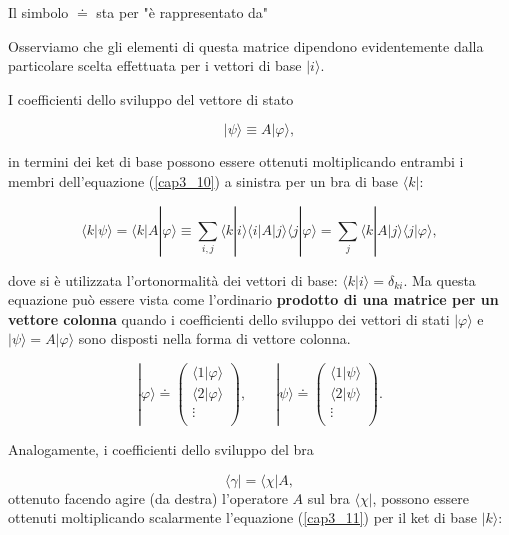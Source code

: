 \documentclass[a4paper,12pt,oneside]{book}
\begin{document}
Il simbolo $\doteq$ sta per "è rappresentato da"

Osserviamo che gli elementi di questa matrice dipendono evidentemente dalla particolare scelta effettuata per i vettori di base $| i \rangle$.

I coefficienti dello sviluppo del vettore di stato

\begin{equation}
| \psi \rangle \equiv A | \varphi \rangle ,
\end{equation}

in termini dei ket di base possono essere ottenuti moltiplicando entrambi i membri dell'equazione (\ref{cap3_10}) a sinistra per un bra di base $\langle k | $:

\begin{equation}
\langle k | \psi \rangle = \langle k | A | \varphi \rangle \equiv \sum \limits_{i,j} \langle k | i \rangle \langle i | A | j\rangle \langle j | \varphi \rangle = \sum \limits_{j} \langle k | A | j \rangle \langle j | \varphi \rangle ,
\end{equation}

dove si è utilizzata l'ortonormalità dei vettori di base: $\langle k | i \rangle =\delta_{ki}$. Ma questa equazione può essere vista come l'ordinario \textbf{prodotto di una matrice per un vettore colonna} quando i coefficienti dello sviluppo dei vettori di stati $| \varphi \rangle$ e $| \psi \rangle =A | \varphi \rangle$ sono disposti nella forma di vettore colonna.

\begin{equation}
| \varphi \rangle \doteq 
\begin{pmatrix}
\langle 1 | \varphi \rangle \\
\langle 2 | \varphi \rangle \\
\vdots \\
\end{pmatrix}, \qquad
| \psi \rangle \doteq 
\begin{pmatrix}
\langle 1 | \psi \rangle \\
\langle 2 | \psi \rangle \\
\vdots \\
\end{pmatrix} .
\end{equation}

Analogamente, i coefficienti dello sviluppo del bra

\begin{equation}
\langle \gamma | = \langle \chi | A ,
\end{equation}
ottenuto facendo agire (da destra) l'operatore $A$ sul bra $\langle \chi | $, possono essere ottenuti moltiplicando scalarmente l'equazione (\ref{cap3_11}) per il ket di base $| k \rangle$:
\end{document}
